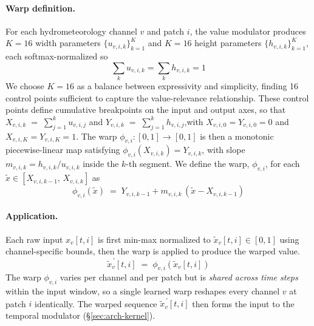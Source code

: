 \paragraph{Warp definition.}
For each hydrometeorology channel $v$ and patch $i$, the value modulator produces $K = 16$ width parameters $\{u_{v,i,k}\}_{k=1}^{K}$ and $K = 16$ height parameters $\{h_{v,i,k}\}_{k=1}^{K}$, each softmax-normalized so 
\[\sum_k u_{v,i,k} = \sum_k h_{v,i,k} = 1\]
%
We choose $K=16$ as a balance between expressivity and simplicity, finding 16 control points sufficient to capture the value-relevance relationship.
%
These control points define cumulative breakpoints on the input and output axes, so that $X_{v,i,k} \;=\; \sum_{j=1}^{k} u_{v,i,j}$ and $Y_{v,i,k} \;=\; \sum_{j=1}^{k} h_{v,i,j}$,with $X_{v,i,0} = Y_{v,i,0} = 0$ and $X_{v,i,K} = Y_{v,i,K} = 1$. 
%
The warp $\phi_{v,i} : [0, 1] \to [0, 1]$ is then a monotonic piecewise-linear map satisfying $\phi_{v,i}(X_{v,i,k}) = Y_{v,i,k}$, with slope $m_{v,i,k} = h_{v,i,k} / u_{v,i,k}$ inside the $k$-th segment.
%
We define the warp, $\phi_{v,i}$, for each $\tilde{x}\in [X_{v,i,k-1},\, X_{v,i,k}]$ as 
\[\phi_{v,i}(\tilde{x}) \;=\; Y_{v,i,k-1} + m_{v,i,k}\,(\tilde{x} - X_{v,i,k-1})\]
%

\paragraph{Application.}
Each raw input $x_v[t, i]$ is first min-max normalized to $\tilde{x}_v[t, i] \in [0, 1]$ using channel-specific bounds, then the warp is applied to produce the warped value.
\[\tilde{x}^{\,\prime}_v[t, i] \;=\; \phi_{v,i}\!\left(\tilde{x}_v[t, i]\right)\]
The warp $\phi_{v,i}$ varies per channel and per patch but is \emph{shared across time steps} within the input window, so a single learned warp reshapes every channel $v$ at patch $i$ identically. The warped sequence $\tilde{x}^{\,\prime}_v[t, i]$ then forms the input to the temporal modulator (\S\ref{sec:arch-kernel}).

